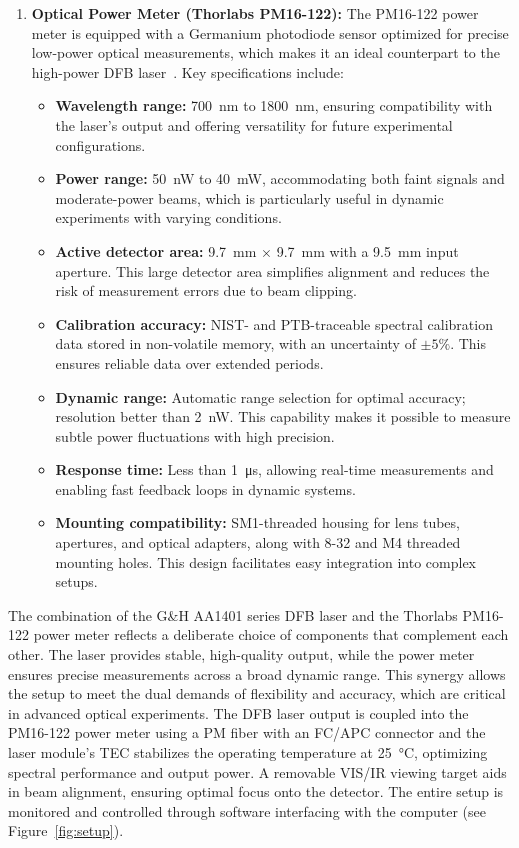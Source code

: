 \documentclass[prl,twocolumn]{revtex4-1}
\begin{document}
\begin{enumerate}
    \item \textbf{Optical Power Meter (Thorlabs PM16-122):}
    The PM16-122 power meter is equipped with a Germanium photodiode sensor optimized for precise low-power optical measurements, which makes it an ideal counterpart to the high-power DFB laser~\cite{pap5}. Key specifications include:
    \begin{itemize}[noitemsep]
        \item \textbf{Wavelength range:} \SI{700}{\nano\meter} to \SI{1800}{\nano\meter}, ensuring compatibility with the laser's output and offering versatility for future experimental configurations.
        \item \textbf{Power range:} \SI{50}{\nano\watt} to \SI{40}{\milli\watt}, accommodating both faint signals and moderate-power beams, which is particularly useful in dynamic experiments with varying conditions.
        \item \textbf{Active detector area:} \SI{9.7}{\milli\meter} $\times$ \SI{9.7}{\milli\meter} with a \SI{9.5}{\milli\meter} input aperture. This large detector area simplifies alignment and reduces the risk of measurement errors due to beam clipping.
        \item \textbf{Calibration accuracy:} NIST- and PTB-traceable spectral calibration data stored in non-volatile memory, with an uncertainty of \(\pm 5\%\). This ensures reliable data over extended periods.
        \item \textbf{Dynamic range:} Automatic range selection for optimal accuracy; resolution better than \SI{2}{\nano\watt}. This capability makes it possible to measure subtle power fluctuations with high precision.
        \item \textbf{Response time:} Less than \SI{1}{\micro\second}, allowing real-time measurements and enabling fast feedback loops in dynamic systems.
        \item \textbf{Mounting compatibility:} SM1-threaded housing for lens tubes, apertures, and optical adapters, along with 8-32 and M4 threaded mounting holes. This design facilitates easy integration into complex setups.
    \end{itemize}
\end{enumerate}

The combination of the G\&H AA1401 series DFB laser and the Thorlabs PM16-122 power meter reflects a deliberate choice of components that complement each other. The laser provides stable, high-quality output, while the power meter ensures precise measurements across a broad dynamic range. This synergy allows the setup to meet the dual demands of flexibility and accuracy, which are critical in advanced optical experiments. The DFB laser output is coupled into the PM16-122 power meter using a PM fiber with an FC/APC connector and the laser module's TEC stabilizes the operating temperature at \SI{25}{\degreeCelsius}, optimizing spectral performance and output power. A removable VIS/IR viewing target aids in beam alignment, ensuring optimal focus onto the detector. The entire setup is monitored and controlled through software interfacing with the computer (see Figure~\ref{fig:setup}).
\end{document}

